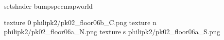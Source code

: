 setshader bumpspecmapworld

texture 0 philipk2/pk02_floor06b_C.png
texture n philipk2/pk02_floor06a_N.png
texture s philipk2/pk02_floor06a_S.png

